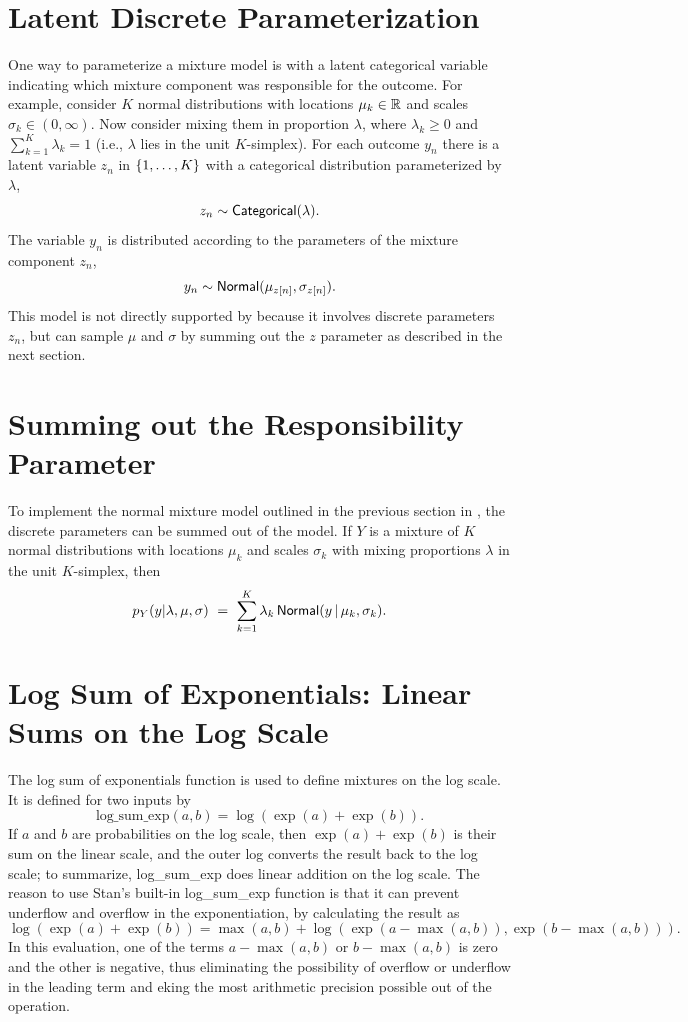 \section{Latent Discrete Parameterization}

One way to parameterize a mixture model is with a latent categorical
variable indicating which mixture component was responsible for the
outcome. For example, consider $K$ normal distributions with locations
$\mu_k \in \reals$ and scales $\sigma_k \in (0,\infty)$.  Now consider
mixing them in proportion $\lambda$, where $\lambda_k \geq 0$ and
$\sum_{k=1}^K \lambda_k = 1$ (i.e., $\lambda$ lies in the unit $K$-simplex).
For each outcome $y_n$ there is a latent variable $z_n$ in
$\setlist{1,\ldots,K}$ with a categorical distribution parameterized
by $\lambda$,
%
\[
z_n \sim \distro{Categorical}(\lambda).
\]
%
The variable $y_n$ is distributed according to the parameters
of the mixture component $z_n$, 
\[
y_n \sim \distro{Normal}(\mu_{z[n]},\sigma_{z[n]}).
\]
%
This model is not directly supported by \Stan because it involves
discrete parameters $z_n$, but \Stan can sample $\mu$ and $\sigma$ 
by summing out the $z$ parameter as described in the next section.


\section{Summing out the Responsibility Parameter}

To implement the normal mixture model outlined in the previous
section in \Stan, the discrete parameters can be summed out of the
model. If $Y$ is a mixture of $K$ normal distributions with 
locations $\mu_k$ and scales $\sigma_k$ with mixing proportions
$\lambda$ in the unit $K$-simplex, then 
\[
p_Y(y | \lambda, \mu, \sigma)
\ = \ 
\sum_{k=1}^K \lambda_k \, \distro{Normal}(y \, | \, \mu_k, \sigma_k).
\]

\section{Log Sum of Exponentials: Linear Sums on the Log Scale}

The log sum of exponentials function is used to define mixtures on the
log scale.  It is defined for two inputs by
%
\[
\mbox{log\_sum\_exp}(a, b) = \log (\exp(a) + \exp(b)).
\]
%
If $a$ and $b$ are probabilities on the log scale, then $\exp(a) +
\exp(b)$ is their sum on the linear scale, and the outer log converts
the result back to the log scale; to summarize, log\_sum\_exp does
linear addition on the log scale.   The reason to use Stan's built-in
log\_sum\_exp function is that it can prevent underflow and overflow
in the exponentiation, by calculating the result as
%
\[
\log(\exp(a) + \exp(b))
= \max(a, b) + \log(\exp(a - \max(a, b)), \exp(b - \max(a, b))).
\]
%
In this evaluation, one of the terms $a - \max(a, b)$ or $b -
\max(a, b)$ is zero and the other is negative, thus eliminating the
possibility of overflow or underflow in the leading term and eking the
most arithmetic precision possible out of the operation.

